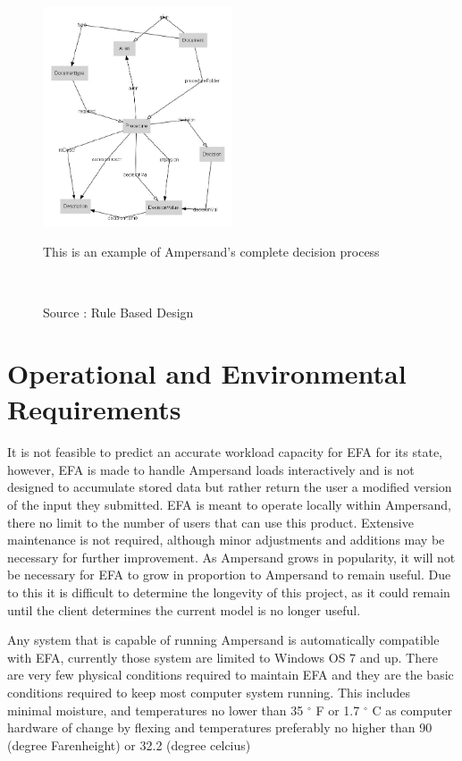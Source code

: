 \documentclass[12pt]{report}
\begin{document}
\begin{figure}
	\centering
	\includegraphics[width=0.5\textwidth]{../figures/Ampersanddecision}
	\caption{This is an example of Ampersand's complete decision process}
  {\captionsetup{font=small}\caption*{Source : Rule Based Design \cite{RBD}}}
	~\label{fig:figure5}
\end{figure}
\section{Operational and Environmental Requirements}\label{sec:Operational}
\paragraph*{}
It is not feasible to predict an accurate workload capacity for EFA for its state, however, 
EFA is made to handle Ampersand loads interactively and is not designed to accumulate stored 
data but rather return the user a modified version of the input they submitted. EFA is meant to 
operate locally within Ampersand, there no limit to the number of users that can use this product. 
Extensive maintenance is not required, although minor adjustments and additions may be necessary 
for further improvement. As Ampersand grows in popularity, it will not be necessary for EFA to 
grow in proportion to Ampersand to remain useful. Due to this it is difficult to determine the 
longevity of this project, as it could remain until the client determines the current model is no 
longer useful. 

Any system that is capable of running Ampersand is automatically compatible with EFA, currently 
those system are limited to Windows OS 7 and up. There are very few physical conditions required to 
maintain EFA and they are the basic conditions required to keep most computer system running. 
This includes minimal moisture, and temperatures no lower than 35 $^{\circ}$ F or 1.7 
$^{\circ}$ C 
as computer hardware of change by flexing 
 and 
temperatures preferably no higher than 90 (degree Farenheight) or 32.2 (degree celcius)
\end{document}
